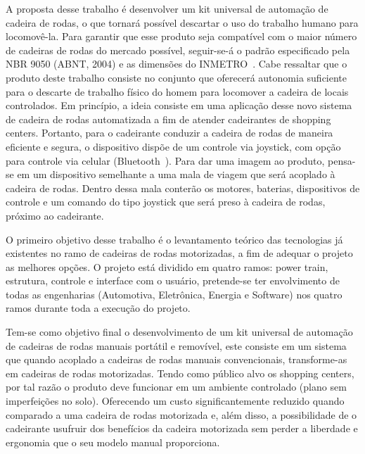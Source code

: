A proposta desse trabalho é desenvolver um kit universal de automação de cadeira de rodas, o que tornará possível descartar o uso do trabalho humano para locomovê-la. Para garantir que esse produto seja compatível com o maior número de cadeiras de rodas do mercado possível, seguir-se-á o padrão especificado pela NBR 9050 (ABNT, 2004) e as dimensões do INMETRO~\cite{inmetro}. Cabe ressaltar que o produto deste trabalho consiste no conjunto que oferecerá autonomia suficiente para o descarte de trabalho físico do homem para locomover a cadeira de locais controlados. Em princípio, a ideia consiste em uma aplicação desse novo sistema de cadeira de rodas automatizada a fim de atender cadeirantes de shopping centers. Portanto, para o cadeirante conduzir a cadeira de rodas de maneira eficiente e segura, o dispositivo dispõe de um controle via joystick, com opção para controle via celular (Bluetooth~\cite{bluetooth}). Para dar uma imagem ao produto, pensa-se em um dispositivo semelhante a uma mala de viagem que será acoplado à cadeira de rodas. Dentro dessa mala conterão os motores, baterias, dispositivos de controle e um comando do tipo joystick que será preso à cadeira de rodas, próximo ao cadeirante.

O primeiro objetivo desse trabalho é o levantamento teórico das tecnologias já existentes no ramo de cadeiras de rodas motorizadas, a fim de adequar o projeto as melhores opções. O projeto está dividido em quatro ramos: power train, estrutura, controle e interface com o usuário, pretende-se ter envolvimento de todas as engenharias (Automotiva, Eletrônica, Energia e Software) nos quatro ramos durante toda a execução do projeto.

Tem-se como objetivo final o desenvolvimento de um kit universal de automação de cadeiras de rodas manuais portátil e removível, este consiste em um sistema que quando acoplado a cadeiras de rodas manuais convencionais, transforme-as em cadeiras de rodas motorizadas. Tendo como público alvo os shopping centers, por tal razão o produto deve funcionar em um ambiente controlado (plano sem imperfeições no solo). Oferecendo um custo significantemente reduzido quando comparado a uma cadeira de rodas motorizada e, além disso, a possibilidade de o cadeirante usufruir dos benefícios da cadeira motorizada sem perder a liberdade e ergonomia que o seu modelo manual proporciona.

